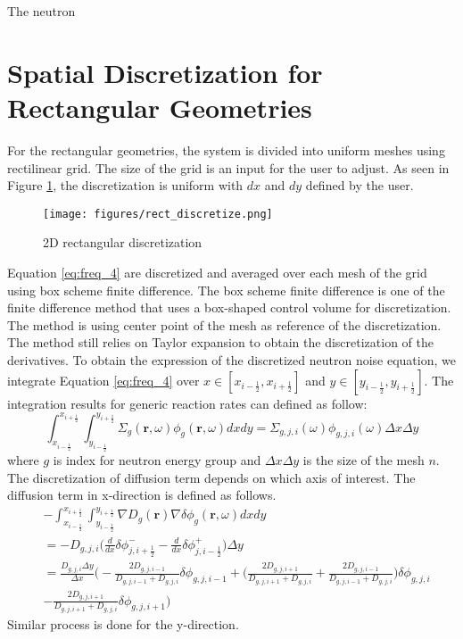 \label{ch:simulations}

The neutron 
\section{Spatial Discretization for Rectangular Geometries}
\label{sec:rectangular_discretization}
For the rectangular geometries, the system is divided into uniform meshes using rectilinear grid. The size of the grid is an input for the user to adjust. As seen in Figure \ref{fig:rect_discretize}, the discretization is uniform with $dx$ and $dy$ defined by the user. 
\begin{figure}[h]
        \centering
        \texttt{[image: figures/rect\_discretize.png]}
        \caption{2D rectangular discretization}
        \label{fig:rect_discretize}
\end{figure}

Equation \ref{eq:freq_4} are discretized and averaged over each mesh of the grid using box scheme finite difference. The box scheme finite difference is one of the finite difference method that uses a box-shaped control volume for discretization. The method is using center point of the mesh as reference of the discretization. The method still relies on Taylor expansion to obtain the discretization of the derivatives. To obtain the expression of the discretized neutron noise equation, we integrate Equation \ref{eq:freq_4} over $x \in [x_{i - \frac{1}{2}}, x_{i + \frac{1}{2}}]$ and $y \in [y_{i - \frac{1}{2}}, y_{i + \frac{1}{2}}]$.
The integration results for generic reaction rates can defined as follow:
\begin{equation}
        \int_{x_{i - \frac{1}{2}}}^{x_{i + \frac{1}{2}}} \int_{y_{i - \frac{1}{2}}}^{y_{i + \frac{1}{2}}} \Sigma_{g}(\textbf{r}, \omega) \phi_{g}(\textbf{r}, \omega) dx dy = \Sigma_{g,j,i}(\omega) \phi_{g,j,i}(\omega) \Delta x \Delta y
\end{equation}
where $g$ is index for neutron energy group and $\Delta x \Delta y$ is the size of the mesh $n$. The discretization of diffusion term depends on which axis of interest. The diffusion term in x-direction is defined as follows.
\begin{equation}
        \begin{aligned}
                & - \int_{x_{i - \frac{1}{2}}}^{x_{i + \frac{1}{2}}} \int_{y_{i - \frac{1}{2}}}^{y_{i + \frac{1}{2}}} \nabla D_g(\textbf{r}) \nabla \delta \phi_g(\textbf{r}, \omega) dx dy \\
                &= - D_{g,j,i} \biggl( \frac{d}{dx} \delta \phi_{j,i + \frac{1}{2}}^- - \frac{d}{dx} \delta \phi_{j,i - \frac{1}{2}}^+ \biggr) \Delta y\\
                &= \frac{D_{g,j,i} \Delta y}{\Delta x} \biggl( -\frac{2 D_{g,j,i-1}}{D_{g,j,i-1} + D_{g,j,i}} \delta \phi_{g,j,i-1} + \biggl( \frac{2 D_{g,j,i+1}}{D_{g,j,i+1} + D_{g,j,i}} + \frac{2 D_{g,j,i-1}}{D_{g,j,i-1} + D_{g,j,i}} \biggr) \delta \phi_{g,j,i} \\
                &  -\frac{2 D_{g,j,i+1}}{D_{g,j,i+1} + D_{g,j,i}} \delta \phi_{g,j,i+1} \biggr)
        \end{aligned}
\end{equation}
Similar process is done for the y-direction.

